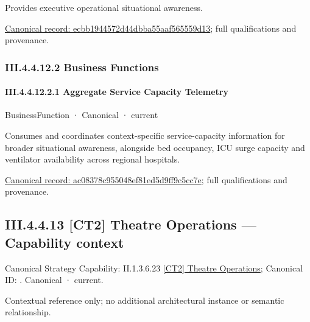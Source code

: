 Provides executive operational situational awareness.


{\footnotesize \href{../../../../../../../continuum/business/business-service/ecbb1944572d44dbba55aaf565559d13.md}{Canonical record: ecbb1944572d44dbba55aaf565559d13}; full qualifications and provenance.}\par
\subsubsection*{III.4.4.12.2 Business Functions}
\label{navigation:III.4.4.12.2}

\paragraph*{III.4.4.12.2.1 Aggregate Service Capacity Telemetry}
\label{navigation:III.4.4.12.2.1}

\label{element:ac08378c955048ef81ed5d9ff9c5cc7e}
{\small BusinessFunction · Canonical · current}\par

Consumes and coordinates context-specific service-capacity information for broader situational awareness, alongside bed occupancy, ICU surge capacity and ventilator availability across regional hospitals.


{\footnotesize \href{../../../../../../../continuum/business/business-function/ac08378c955048ef81ed5d9ff9c5cc7e.md}{Canonical record: ac08378c955048ef81ed5d9ff9c5cc7e}; full qualifications and provenance.}\par
\subsection*{III.4.4.13 [CT2] Theatre Operations — Capability context}
\label{navigation:III.4.4.13}

{\small Canonical Strategy Capability: II.1.3.6.23 \hyperref[element:4bf7a8260e1444fdac44e97c3557b533]{[CT2] Theatre Operations}; Canonical ID: \texttt{}. Canonical · current.}\par
Contextual reference only; no additional architectural instance or semantic relationship.\par
